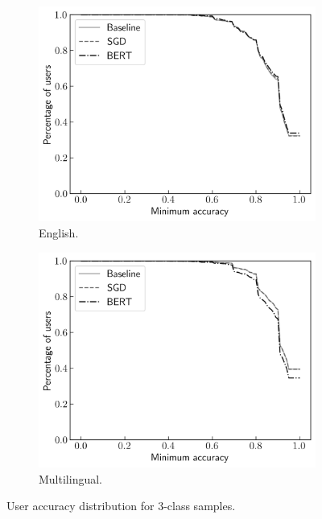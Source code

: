 \begin{figure}[ht]
    \centering
    \begin{subfigure}[ht]{0.49\textwidth}
        \centering
        \includegraphics[width=\textwidth]{figures/06_results/02_pu/02_simple/eng_3.png}
        \caption{English.}
        \label{fig:Res_PU_Simp_E3}
    \end{subfigure}
    \hfill
    \begin{subfigure}[ht]{0.49\textwidth}
        \centering
        \includegraphics[width=\textwidth]{figures/06_results/02_pu/02_simple/any_3.png}
        \caption{Multilingual.}
        \label{fig:Res_PU_Simp_M3}
    \end{subfigure}
    \caption{User accuracy distribution for 3-class samples.}
    \label{fig:Res_PU_Simp_3}
\end{figure}

